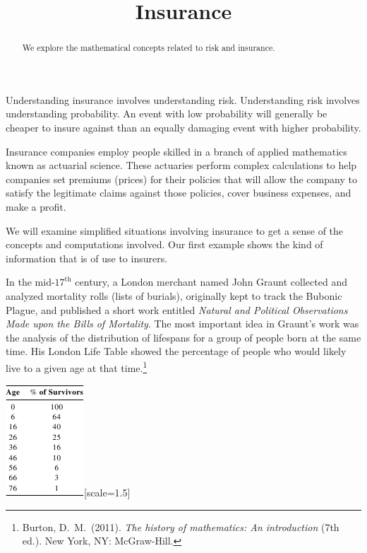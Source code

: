 \documentclass{ximera}
\title{Insurance}
\begin{document}
\begin{abstract}
We explore the mathematical concepts related to risk and insurance.
\end{abstract}

\maketitle

Understanding insurance involves understanding risk. Understanding risk involves understanding probability. An event with low probability will generally be cheaper to insure against than an equally damaging event with higher probability.

Insurance companies employ people skilled in a branch of applied mathematics known as actuarial science. These actuaries perform complex calculations to help companies set premiums (prices) for their policies that will allow the company to satisfy the legitimate claims against those policies, cover business expenses, and make a profit.

We will examine simplified situations involving insurance to get a sense of the concepts and computations involved. Our first example shows the kind of information that is of use to insurers.

In the mid-$17^\text{th}$ century, a London merchant named John Graunt collected and analyzed mortality rolls (lists of burials), originally kept to track the Bubonic Plague, and published a short work entitled \textit{Natural and Political Observations Made upon the Bills of Mortality}. The most important idea in Graunt's work was the analysis of the distribution of lifespans for a group of people born at the same time. His London Life Table showed the percentage of people who would likely live to a given age at that time.\footnote{Burton, D.\ M.\ (2011). \textit{The history of mathematics: An introduction} (7th ed.). New York, NY: McGraw-Hill.}
\begin{image}
\includegraphics{InsuranceTable1.png}[scale=1.5]
\end{image}
\end{document}
